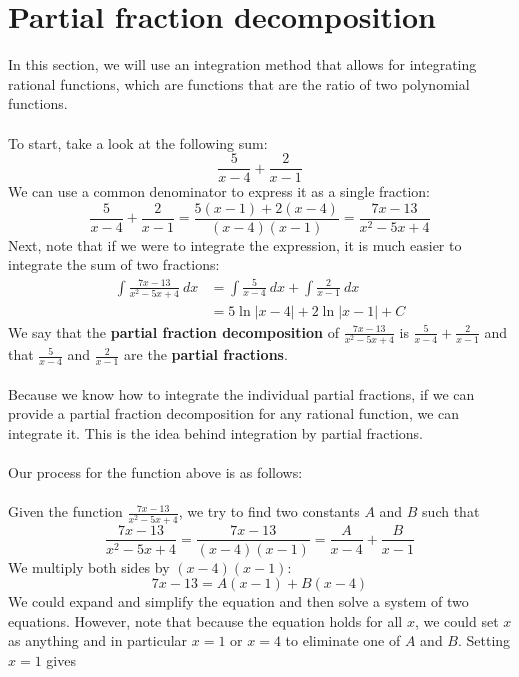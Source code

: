 \documentclass[11pt]{scrartcl}
\begin{document}
\maketitle
\noindent

\section{Partial fraction decomposition}
\noindent
In this section, we will use an integration method that allows for integrating rational functions, which are functions that are the ratio of two polynomial functions. \\
\\
\noindent
To start, take a look at the following sum: 
$$\frac{5}{x-4}+\frac{2}{x-1}$$
We can use a common denominator to express it as a single fraction: 
$$\frac{5}{x-4}+\frac{2}{x-1}=\frac{5(x-1)+2(x-4)}{(x-4)(x-1)}=\frac{7x-13}{x^2-5x+4}$$
Next, note that if we were to integrate the expression, it is much easier to integrate the sum of two fractions:
\begin{align*}
    \int{\frac{7x-13}{x^2-5x+4} \ dx} &=\int{\frac{5}{x-4} \ dx }+\int{\frac{2}{x-1} \ dx} \\ 
                                      &=5\ln \lvert x-4 \rvert+2\ln \lvert x-1 \rvert + C
\end{align*}
\noindent 
We say that the \textbf{partial fraction decomposition} of $\frac{7x-13}{x^2-5x+4}$ is $\frac{5}{x-4}+\frac{2}{x-1}$ and that $\frac{5}{x-4}$ and $\frac{2}{x-1}$ are the \textbf{partial fractions}. \\
\\
\noindent 
Because we know how to integrate the individual partial fractions, if we can provide a partial fraction decomposition for any rational function, we can integrate it. This is the idea behind integration by partial fractions. \\
\\
\noindent 
Our process for the function above is as follows: \\
\\
\noindent 
Given the function $\frac{7x-13}{x^2-5x+4}$, we try to find two constants $A$ and $B$ such that 
$$\frac{7x-13}{x^2-5x+4}=\frac{7x-13}{(x-4)(x-1)}=\frac{A}{x-4}+\frac{B}{x-1}$$
We multiply both sides by $(x-4)(x-1)$: 
$$7x-13=A(x-1)+B(x-4)$$
We could expand and simplify the equation and then solve a system of two equations. However, note that because the equation holds for all $x$, we could set $x$ as anything and in particular $x=1$ or $x=4$ to eliminate one of $A$ and $B$. Setting $x=1$ gives 
\end{document}
